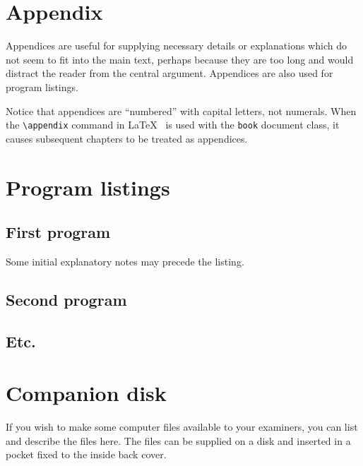 \documentclass[12pt,openany,a4paper]{book}
\begin{document}
\newpage
{}
\mbox{}
\newpage



\chapter{Appendix}

Appendices are useful for supplying necessary details or explanations
which do not seem to fit into the main text, perhaps because they are
too long and would distract the reader from the central argument.
Appendices are also used for program listings.

Notice that appendices are ``numbered'' with capital letters, not
numerals.  When the \verb+\appendix+ command in
\LaTeX~\cite[p.\,175]{lamport} is used with the \texttt{book} document
class, it causes subsequent chapters to be treated as appendices.

\chapter{Program listings}

\section{First program}

Some initial explanatory notes may precede the listing.

\section{Second program}

\section{Etc.}

\chapter{Companion disk}

If you wish to make some computer files available to your examiners,
you can list and describe the files here.  The files can be supplied
on a disk and inserted in a pocket fixed to the inside back cover.
\end{document}
